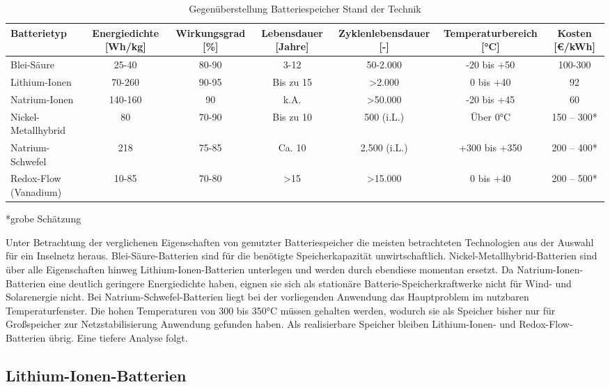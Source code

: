 \begin{table}[htbp]
    \centering
    \caption{Gegenüberstellung Batteriespeicher Stand der Technik}
    \label{tab:Gegenüberstellung_Batteriespeicher_Stand_der_Technik}
    \begin{tabular}{lcccccc}
        \toprule
        \textbf{Batterietyp} & \textbf{Energiedichte [Wh/kg]} & \textbf{Wirkungsgrad [\%]} & \textbf{Lebensdauer [Jahre]} & \textbf{Zyklenlebensdauer [-]} & \textbf{Temperaturbereich [°C]} & \textbf{Kosten [€/kWh]} \\
        \midrule
        Blei-Säure & 25-40 & 80-90 & 3-12 & 50-2.000 & -20 bis +50 & 100-300 \\
        Lithium-Ionen & 70-260 & 90-95 & Bis zu 15 & >2.000 & 0 bis +40 & 92 \\
        Natrium-Ionen & 140-160 & 90 & k.A. & >50.000 & -20 bis +45 & 60 \\
        Nickel-Metallhybrid & 80 & 70-90 & Bis zu 10 & 500 (i.L.) & Über 0°C & 150 – 300* \\
        Natrium-Schwefel & 218 & 75-85 & Ca. 10 & 2.500 (i.L.) & +300 bis +350 & 200 – 400* \\
        Redox-Flow (Vanadium) & 10-85 & 70-80 & >15 & >15.000 & 0 bis +40 & 200 – 500* \\
        \bottomrule
    \end{tabular}
\end{table}
*grobe Schätzung

Unter Betrachtung der verglichenen Eigenschaften von genutzter Batteriespeicher die meisten betrachteten Technologien aus der Auswahl für ein Inselnetz heraus. Blei-Säure-Batterien sind für die benötigte Speicherkapazität unwirtschaftlich. Nickel-Metallhybrid-Batterien sind über alle Eigenschaften hinweg Lithium-Ionen-Batterien unterlegen und werden durch ebendiese momentan ersetzt. Da Natrium-Ionen-Batterien eine deutlich geringere Energiedichte haben, eignen sie sich als stationäre Batterie-Speicherkraftwerke nicht für Wind- und Solarenergie nicht. Bei Natrium-Schwefel-Batterien liegt bei der vorliegenden Anwendung das Hauptproblem im nutzbaren Temperaturfenster. Die hohen Temperaturen von 300 bis 350°C müssen gehalten werden, wodurch sie als Speicher bisher nur für Großspeicher zur Netzstabilisierung Anwendung gefunden haben. Als realisierbare Speicher bleiben Lithium-Ionen- und Redox-Flow-Batterien übrig. Eine tiefere Analyse folgt.

\subsection{Lithium-Ionen-Batterien}

